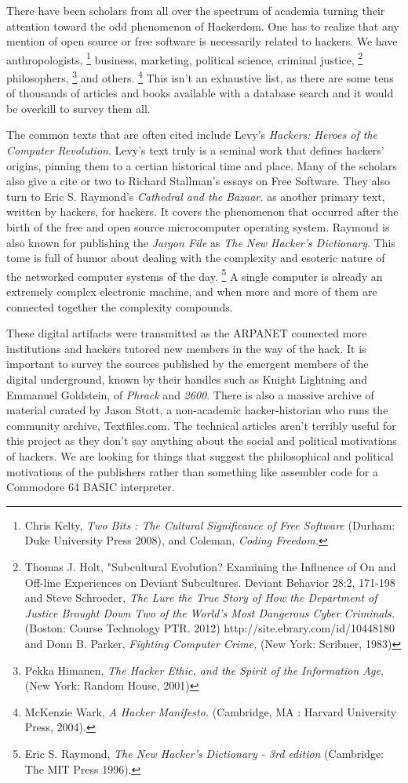 \documentclass[11pt]{article}
\begin{document}
There have been scholars from all over the spectrum of academia turning their attention toward the odd phenomenon of Hackerdom. One has to realize that any mention of open source or free software is necessarily related to hackers. We have anthropologists,
\footnote{Chris Kelty, \emph{Two Bits : The Cultural Significance of Free Software} (Durham: Duke University Press 2008), and Coleman, \emph{Coding Freedom.}}
business, marketing, political science, criminal justice,
\footnote{Thomas J. Holt, "Subcultural Evolution? Examining the Influence of On and Off-line Experiences on Deviant Subcultures. Deviant Behavior 28:2, 171-198 and Steve Schroeder, \emph{The Lure the True Story of How the Department of Justice Brought Down Two of the World's Most Dangerous Cyber Criminals.} (Boston: Course Technology PTR. 2012) http://site.ebrary.com/id/10448180 and Donn B. Parker, \emph{Fighting Computer Crime,} (New York: Scribner, 1983)}
philosophers,
\footnote{Pekka Himanen, \emph{The Hacker Ethic, and the Spirit of the Information Age}, (New York: Random House, 2001)}
 and others.
\footnote{McKenzie Wark, \emph{A Hacker Manifesto.} (Cambridge, MA : Harvard University Press, 2004).} 
This isn't an exhaustive list, as there are some tens of thousands of articles and books available with a database search and it would be overkill to survey them all.

The common texts that are often cited include Levy's \emph{Hackers: Heroes of the Computer Revolution}. Levy's text truly is a seminal work that defines hackers' origins, pinning them to a certian historical time and place. Many of the scholars also give a cite or two to Richard Stallman's essays on Free Software. They also turn to Eric S. Raymond's \emph{Cathedral and the Bazaar.} as another primary text, written by hackers, for hackers. It covers the phenomenon that occurred after the birth of the free and open source microcomputer operating system.  Raymond is also known for publishing the \emph{Jargon File} as \emph{The New Hacker's Dictionary}. This tome is full of humor about dealing with the complexity and esoteric nature of the networked computer systems of the day.
\footnote{Eric S. Raymond, \emph{The New Hacker's Dictionary - 3rd edition} (Cambridge: The MIT Press 1996).}
A single computer is already an extremely complex electronic machine, and when more and more of them are connected together the complexity compounds.

These digital artifacts were transmitted as the ARPANET connected more institutions and hackers tutored new members in the way of the hack. It is important to survey the sources published by the emergent members of the digital underground, known by their handles such as Knight Lightning and Emmanuel Goldstein, of \emph{Phrack} and \emph{2600}. There is also a massive archive of material curated by Jason Stott, a non-academic hacker-historian who runs the community archive, Textfiles.com. The technical articles aren't terribly useful for this project as they don't say anything about the social and political motivations of hackers. We are looking for things that suggest the philosophical and political motivations of the publishers rather than something like assembler code for a Commodore 64 BASIC interpreter.
\end{document}
